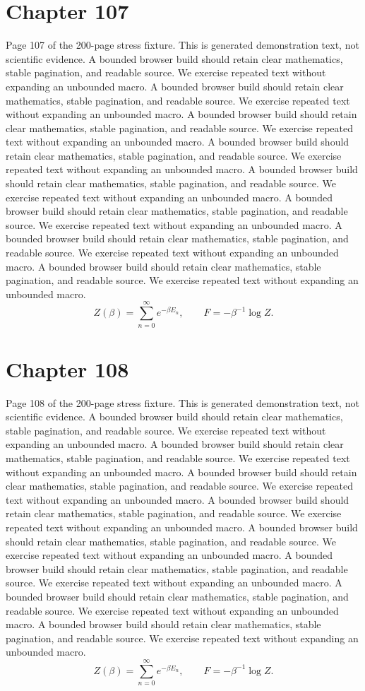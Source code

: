 \documentclass[11pt]{article}
\begin{document}
\section*{Chapter 107}
Page 107 of the 200-page stress fixture. This is generated demonstration text, not scientific evidence.
A bounded browser build should retain clear mathematics, stable pagination, and readable source. We exercise repeated text without expanding an unbounded macro.
A bounded browser build should retain clear mathematics, stable pagination, and readable source. We exercise repeated text without expanding an unbounded macro.
A bounded browser build should retain clear mathematics, stable pagination, and readable source. We exercise repeated text without expanding an unbounded macro.
A bounded browser build should retain clear mathematics, stable pagination, and readable source. We exercise repeated text without expanding an unbounded macro.
A bounded browser build should retain clear mathematics, stable pagination, and readable source. We exercise repeated text without expanding an unbounded macro.
A bounded browser build should retain clear mathematics, stable pagination, and readable source. We exercise repeated text without expanding an unbounded macro.
A bounded browser build should retain clear mathematics, stable pagination, and readable source. We exercise repeated text without expanding an unbounded macro.
A bounded browser build should retain clear mathematics, stable pagination, and readable source. We exercise repeated text without expanding an unbounded macro.
\[Z(\beta)=\sum_{n=0}^{\infty}e^{-\beta E_n},\qquad F=-\beta^{-1}\log Z.\]
\newpage
\section*{Chapter 108}
Page 108 of the 200-page stress fixture. This is generated demonstration text, not scientific evidence.
A bounded browser build should retain clear mathematics, stable pagination, and readable source. We exercise repeated text without expanding an unbounded macro.
A bounded browser build should retain clear mathematics, stable pagination, and readable source. We exercise repeated text without expanding an unbounded macro.
A bounded browser build should retain clear mathematics, stable pagination, and readable source. We exercise repeated text without expanding an unbounded macro.
A bounded browser build should retain clear mathematics, stable pagination, and readable source. We exercise repeated text without expanding an unbounded macro.
A bounded browser build should retain clear mathematics, stable pagination, and readable source. We exercise repeated text without expanding an unbounded macro.
A bounded browser build should retain clear mathematics, stable pagination, and readable source. We exercise repeated text without expanding an unbounded macro.
A bounded browser build should retain clear mathematics, stable pagination, and readable source. We exercise repeated text without expanding an unbounded macro.
A bounded browser build should retain clear mathematics, stable pagination, and readable source. We exercise repeated text without expanding an unbounded macro.
\[Z(\beta)=\sum_{n=0}^{\infty}e^{-\beta E_n},\qquad F=-\beta^{-1}\log Z.\]
\newpage
\end{document}
